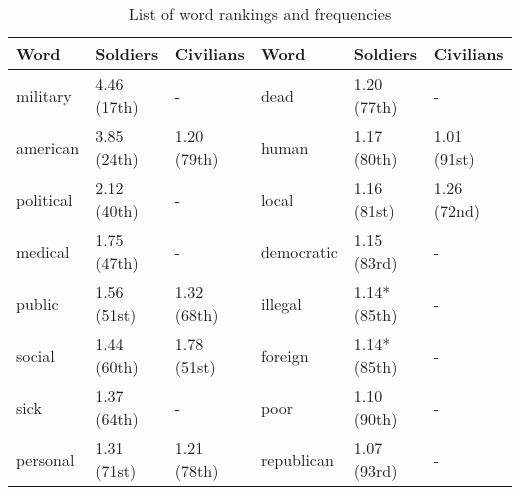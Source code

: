 \begin{table}[h]
  \caption{List of word rankings and frequencies}
  \label{table:wordsComparison}
  \centering
  \renewcommand{\tabularxcolumn}{m} %
  \begin{tabularx}{\textwidth}{l | l | l || l | l | l}
    \toprule
    \textbf{Word} & \textbf{Soldiers} & \textbf{Civilians} & \textbf{Word} & \textbf{Soldiers} & \textbf{Civilians}
    \tabularnewline \midrule
    military
                  &
    4.46 (17th)   & -                 & dead               & 1.20 (77th)   & -
    \tabularnewline \hline
    american
                  & 3.85 (24th)       & 1.20 (79th)        & human         & 1.17 (80th)       & 1.01 (91st)
    \tabularnewline \hline
    political
                  & 2.12 (40th)       & -                  & local         & 1.16 (81st)       & 1.26 (72nd)
    \tabularnewline \hline
    medical
                  & 1.75 (47th)       & -                  & democratic
                  & 1.15 (83rd)       & -
    \tabularnewline \hline
    public
                  & 1.56 (51st)       & 1.32 (68th)        & illegal
                  & 1.14* (85th)      & -
    \tabularnewline \hline
    social
                  & 1.44 (60th)       & 1.78 (51st)        & foreign
                  & 1.14* (85th)      & -
    \tabularnewline \hline
    sick
                  & 1.37 (64th)       & -                  & poor
                  & 1.10 (90th)       & -
    \tabularnewline \hline
    personal
                  & 1.31 (71st)       & 1.21 (78th)        & republican
                  & 1.07 (93rd)       & -
    \tabularnewline \bottomrule
  \end{tabularx}
\end{table}
